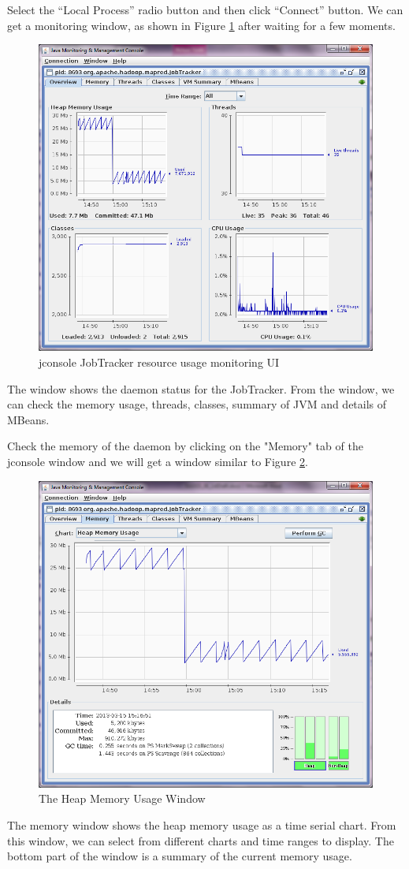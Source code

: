 Select the ``Local Process'' radio button and then click ``Connect'' button. We can get a monitoring window, as shown in Figure \ref{fig:jconsole.jobtracker} after waiting for a few moments.
\begin{figure}[ht]
  \centering
  \includegraphics[width=.7\textwidth]{figs/5163os_06_02.png}
  \caption{jconsole JobTracker resource usage monitoring UI}\label{fig:jconsole.jobtracker}
\end{figure} 
The window shows the daemon status for the JobTracker. From the window, we can check the memory usage, threads, classes, summary of JVM and details of MBeans.

Check the memory of the daemon by clicking on the "Memory" tab of the jconsole window and we will get a window similar to Figure \ref{fig:heap.usage.window}.
\begin{figure}[ht]
  \centering
  \includegraphics[width=.7\textwidth]{figs/5163os_06_03.png}
  \caption{The Heap Memory Usage Window}\label{fig:heap.usage.window}
\end{figure} 
The memory window shows the heap memory usage as a time serial chart. From this window, we can select from different charts and time ranges to display. The bottom part of the window is a summary of the current memory usage.

